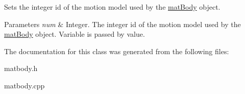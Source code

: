 Sets the integer id of the motion model used by the \hyperlink{classosea_1_1ofreq_1_1mat_body}{mat\-Body} object. 
\begin{DoxyParams}{Parameters}
{\em num} & Integer. The integer id of the motion model used by the \hyperlink{classosea_1_1ofreq_1_1mat_body}{mat\-Body} object. Variable is passed by value. \\
\hline
\end{DoxyParams}


The documentation for this class was generated from the following files\-:\begin{DoxyCompactItemize}
\item 
matbody.\-h\item 
matbody.\-cpp\end{DoxyCompactItemize}
